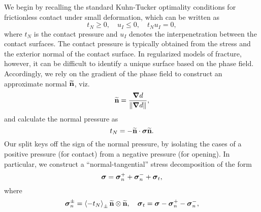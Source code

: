 We begin by recalling the standard Kuhn-Tucker optimality conditions for frictionless contact under small deformation, which can be written as
\begin{equation}
  t_N \geqslant 0, \quad u_I \leqslant 0, \quad t_N u_I = 0,
\end{equation}
where $t_N$ is the contact pressure and $u_I$ denotes the interpenetration between the contact surfaces.  The contact pressure is typically obtained from the stress and the exterior normal of the contact surface.  In regularized models of fracture, however, it can be difficult to identify a unique surface based on the phase field.  Accordingly, we rely on the gradient of the phase field to construct an approximate normal $\widetilde{\textbf{n}}$, viz.
\begin{equation}
  \widetilde{\textbf{n}} = \frac{\boldsymbol{\nabla} d}{ \left\lVert\boldsymbol{\nabla} d\right\rVert },
\end{equation}
and calculate the normal pressure as
\begin{equation}
  \label{eq: pressure}
  t_N = -\widetilde{\textbf{n}}\cdot\boldsymbol{\sigma}\widetilde{\textbf{n}}.
\end{equation}
Our split keys off the sign of the normal pressure, by isolating the cases of a positive pressure (for contact) from a negative pressure (for opening).  In particular, we construct a ``normal-tangential'' stress decomposition of the form
\begin{equation}
  \boldsymbol{\sigma}  = \boldsymbol{\sigma}_n^{+} + \boldsymbol{\sigma}_n^{-}  + \boldsymbol{\sigma}_t ,
\end{equation}
where
\begin{equation}
  \boldsymbol{\sigma}_n^\pm = \left<-t_N\right>_\pm\widetilde{\textbf{n}}\otimes\widetilde{\textbf{n}}, \quad  \boldsymbol{\sigma}_t = \boldsymbol{\sigma} - \boldsymbol{\sigma}_n^+ - \boldsymbol{\sigma}_n^-,
\end{equation}

